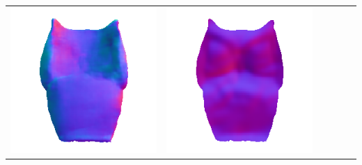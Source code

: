 \begin{tabularx}{\linewidth}{@{}Y@{}Y@{}Y@{}Y@{}Y@{}Y@{}}
\includegraphics[width=\linewidth]{semisynthetic/20160617_15_marrnet_out.png} &
\includegraphics[width=\linewidth]{semisynthetic/20160617_15_ef_out.png} \\

\end{tabularx}
